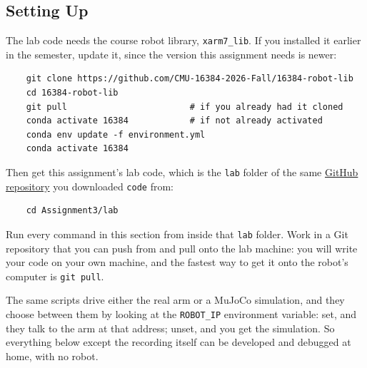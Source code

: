 \documentclass{16384_doc}
\begin{document}
\subsection{Setting Up}

The lab code needs the course robot library, \verb!xarm7_lib!.  If you installed
it earlier in the semester, update it, since the version this assignment needs is
newer:
\begin{verbatim}
    git clone https://github.com/CMU-16384-2026-Fall/16384-robot-lib
    cd 16384-robot-lib
    git pull                        # if you already had it cloned
    conda activate 16384            # if not already activated
    conda env update -f environment.yml
    conda activate 16384
\end{verbatim}

\noindent Then get this assignment's lab code, which is the \verb!lab! folder of
the same \href{https://github.com/CMU-16384-2026-Fall/Assignment3}{GitHub
repository} you downloaded \verb!code! from:
\begin{verbatim}
    cd Assignment3/lab
\end{verbatim}

\noindent Run every command in this section from inside that \verb!lab! folder.
Work in a Git repository that you can push from and pull onto the lab machine:
you will write your code on your own machine, and the fastest way to get it onto
the robot's computer is \verb!git pull!.

The same scripts drive either the real arm or a MuJoCo simulation, and they
choose between them by looking at the \verb!ROBOT_IP! environment variable: set,
and they talk to the arm at that address; unset, and you get the simulation.  So
everything below except the recording itself can be developed and debugged at
home, with no robot.
\end{document}
